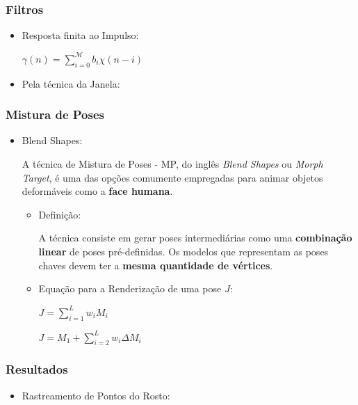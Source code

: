\documentclass[brazil]{beamer}
\begin{document}
\begin{frame}
\frametitle{Filtros}
  \begin{itemize}
      \item Resposta finita ao Impulso: 
      
      $\gamma(n) = 	\sum_{i=0}^{\mathcal{M}} b_i \chi(n-i)$
      
      \item Pela técnica da Janela: 
      

  \end{itemize} 
\end{frame}

\begin{frame}
\frametitle{Mistura de Poses}
  \begin{itemize}
  	
  	\item Blend Shapes:
  	
  	A técnica de Mistura de Poses - MP, do inglês \textit{Blend Shapes} ou \textit{Morph Target}, é uma das opções comumente empregadas para animar objetos deformáveis como a \textbf{face humana}.
  	
 	 	\begin{itemize}
  	
 	 	\item Definição:
  	
 	 	A técnica consiste em gerar poses intermediárias como uma \textbf{combinação linear} de poses pré-definidas. Os modelos que representam as poses chaves devem ter a \textbf{mesma quantidade de vértices}.
  	
  	
  	    \item Equação para a Renderização de uma pose $J$:
      
   		   $J = \sum_{i=1}^L  w_i M_i$
      
   		   $J = M_1 + \sum_{i = 2}^L w_i \Delta M_i $

  \end{itemize} 

  \end{itemize} 
\end{frame}

\begin{frame}
\frametitle{Resultados}
  \begin{itemize}
      \item Rastreamento de Pontos do Rosto:
      
       
          
  \end{itemize} 
\end{frame}
\end{document}
